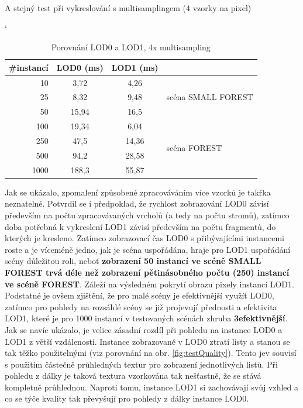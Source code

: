 A stejný test při vykreslování s multisamplingem (4 vzorky na pixel)

\begin{table}[!hbt]
\catcode`
\centering
\begin{tabular}{|r | c | c | l } 
\cline{1-3}
\#instancí & LOD0 (ms)& LOD1 (ms)& \\ [0.5ex] 
\hline
\hline
10	&	3,72	&	4,26	& 	\multirow{3}{*}{scéna SMALL FOREST}\\
25	&	8,32	&	9,48	&	 \\
50	&	15,94	&	16,5	&	 \\
\hline
100	& 	19,34	&	6,04	&	\multirow{4}{*}{scéna FOREST}\\
250	& 	47,5		&	14,36	&\\
500	& 	94,2 	& 	28,58	&\\
1000 & 	188,3 	& 	55,87	&\\
\cline{1-3}
\end{tabular}
\caption{Porovnání LOD0 a LOD1, 4x multisampling\label{table:lod01-4MS}}
\end{table}
 Jak se ukázalo, zpomalení způsobené zpracováváním více vzorků je takřka neznatelné. Potvrdil se i předpoklad, že rychlost zobrazování LOD0 závisí především na počtu zpracovávaných vrcholů (a tedy na počtu stromů), zatímco doba potřebná k vykreslení LOD1 závisí především na počtu fragmentů, do kterých je kresleno. Zatímco zobrazovací čas LOD0 s přibývajícími instancemi roste a je víceméně jedno, jak je scéna uspořádána, hraje pro LOD1 uspořádání scény důležitou roli, neboť {\bf zobrazení 50 instancí ve scéně SMALL FOREST trvá déle než zobrazení pětinásobného počtu (250) instancí ve scéně FOREST}. Záleží na výsledném pokrytí obrazu pixely instancí LOD1.
 Podstatné je ovšem zjištění, že pro malé scény je efektivnější využít LOD0, zatímco pro pohledy na rozsáhlé scény se již projevují přednosti a efektivita LOD1, které je pro 1000 instancí v testovaných scénách zhruba {\bf 3\texttimes efektivnější}. Jak se navíc ukázalo, je velice zásadní rozdíl při pohledu na instance LOD0 a LOD1 z větší vzdálenosti. Instance zobrazované v LOD0 ztratí listy a stanou se tak těžko použitelnými (viz porovnání na obr. \ref{fig:testQuality}). Tento jev souvisí s použitím částečně průhledných textur pro zobrazení jednotlivých listů. Při pohledu z dálky je taková textura vzorkována tak nešťastně, že se stává kompletně průhlednou. Naproti tomu, instance LOD1 si zachovávají svůj vzhled a co se týče kvality tak převyšují pro pohledy z dálky instance LOD0.

